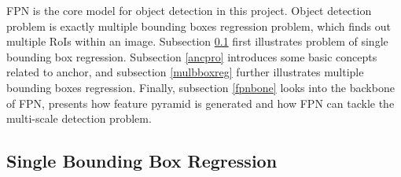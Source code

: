 FPN is the core model for object detection in this project. Object detection problem is exactly multiple bounding boxes regression problem, which finds out multiple RoIs within an image. Subsection \ref{sglbboxreg} first illustrates problem of single bounding box regression. Subsection \ref{ancpro} introduces some basic concepts related to anchor, and subsection \ref{mulbboxreg} further illustrates multiple bounding boxes regression. Finally, subsection \ref{fpnbone} looks into the backbone of FPN, presents how feature pyramid is generated and how FPN can tackle the multi-scale detection problem.

\subsection{Single Bounding Box Regression}\label{sglbboxreg}

